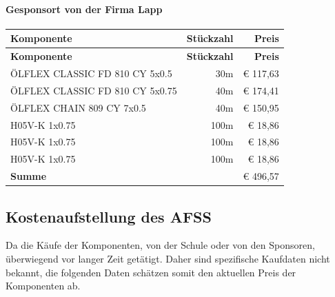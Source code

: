 \paragraph{Gesponsort von der Firma Lapp}
\begin{longtable}{|p{7cm}|r|r|}
    \hline
    \textbf{Komponente} & \textbf{Stückzahl} & \textbf{Preis} \\
    \hline
    \endfirsthead

    \hline
    \textbf{Komponente} & \textbf{Stückzahl} & \textbf{Preis} \\
    \hline
    \endhead

    \hline
    \endfoot

    \hline
    \endlastfoot
    \hline
    \hline
    ÖLFLEX CLASSIC FD 810 CY 5x0.5 & 30m & € 117,63 \\
    ÖLFLEX CLASSIC FD 810 CY 5x0.75 & 40m & € 174,41 \\
    ÖLFLEX CHAIN 809 CY 7x0.5 & 40m & € 150,95 \\
    H05V-K 1x0.75 & 100m & € 18,86 \\
    H05V-K 1x0.75 & 100m & € 18,86 \\
    H05V-K 1x0.75 & 100m & € 18,86 \\
    \textbf{Summe} & & € 496,57\\
\end{longtable}

\subsection{Kostenaufstellung des AFSS}
Da die Käufe der Komponenten, von der Schule oder von den Sponsoren, überwiegend vor langer Zeit getätigt. Daher sind spezifische Kaufdaten nicht bekannt, die folgenden Daten schätzen somit den aktuellen Preis der Komponenten ab. 
